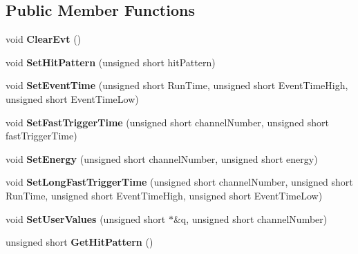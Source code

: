 \subsection*{Public Member Functions}
\begin{DoxyCompactItemize}
\item 
\hypertarget{class_dgf_sub_event_a46977843cc3254ae9c129cf044b9a140}{void {\bfseries Clear\-Evt} ()}\label{class_dgf_sub_event_a46977843cc3254ae9c129cf044b9a140}

\item 
\hypertarget{class_dgf_sub_event_a57465895ade7d2bd229d7c4b6eac28fe}{void {\bfseries Set\-Hit\-Pattern} (unsigned short hit\-Pattern)}\label{class_dgf_sub_event_a57465895ade7d2bd229d7c4b6eac28fe}

\item 
\hypertarget{class_dgf_sub_event_ae7733bc6e848b1f87add491e3e4139f2}{void {\bfseries Set\-Event\-Time} (unsigned short Run\-Time, unsigned short Event\-Time\-High, unsigned short Event\-Time\-Low)}\label{class_dgf_sub_event_ae7733bc6e848b1f87add491e3e4139f2}

\item 
\hypertarget{class_dgf_sub_event_afbfad40671d380b51f11e920ba2bb109}{void {\bfseries Set\-Fast\-Trigger\-Time} (unsigned short channel\-Number, unsigned short fast\-Trigger\-Time)}\label{class_dgf_sub_event_afbfad40671d380b51f11e920ba2bb109}

\item 
\hypertarget{class_dgf_sub_event_a2f301efaff91959dae2a3b4d015b8cd5}{void {\bfseries Set\-Energy} (unsigned short channel\-Number, unsigned short energy)}\label{class_dgf_sub_event_a2f301efaff91959dae2a3b4d015b8cd5}

\item 
\hypertarget{class_dgf_sub_event_a09387034596827f924bce4a4aa84a8be}{void {\bfseries Set\-Long\-Fast\-Trigger\-Time} (unsigned short channel\-Number, unsigned short Run\-Time, unsigned short Event\-Time\-High, unsigned short Event\-Time\-Low)}\label{class_dgf_sub_event_a09387034596827f924bce4a4aa84a8be}

\item 
\hypertarget{class_dgf_sub_event_a5dd58fb29bb11c8870ef8f275024a995}{void {\bfseries Set\-User\-Values} (unsigned short $\ast$\&q, unsigned short channel\-Number)}\label{class_dgf_sub_event_a5dd58fb29bb11c8870ef8f275024a995}

\item 
\hypertarget{class_dgf_sub_event_a19d751e8ab22da36113ba864b28b425e}{unsigned short {\bfseries Get\-Hit\-Pattern} ()}\label{class_dgf_sub_event_a19d751e8ab22da36113ba864b28b425e}


\end{DoxyCompactItemize}
